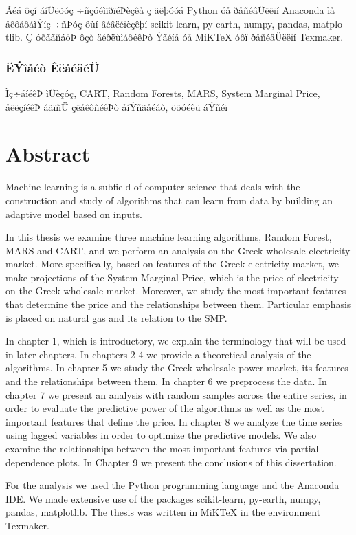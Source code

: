 \documentclass[12pt, twoside, a4paper]{book}
\newcommand{\tl}[1]{\textlatin{#1}}
\newcommand{\en}{\selectlanguage{english}}
\begin{document}
Ãéá ôçí áíÜëõóç ÷ñçóéìïðïéÞèçêå ç ãëþóóá \tl{Python} óå ðåñéâÜëëïí \tl{Anaconda} ìå åêôåôáìÝíç ÷ñÞóç ôùí âéâëéïèçêþí \tl{scikit-learn, py-earth, numpy, pandas, matplotlib}. Ç óõããñáöÞ ôçò äéðëùìáôéêÞò Ýãéíå óå \tl{MiKTeX} óôï ðåñéâÜëëïí \tl{Texmaker}.

\subsection*{ËÝîåéò ÊëåéäéÜ}
Ìç÷áíéêÞ ìÜèçóç, \tl{CART, Random Forests, MARS, System Marginal Price}, åëëçíéêÞ áãïñÜ çëåêôñéêÞò åíÝñãåéáò, öõóéêü áÝñéï

\newpage
\thispagestyle{empty}
\chapter*{\textlatin{Abstract}}
\en
Machine learning is a subfield of computer science that deals with the construction and study of algorithms that can learn from data by building an adaptive model based on inputs.

In this thesis we examine three machine learning algorithms, Random Forest, MARS and CART, and we perform an analysis on the Greek wholesale electricity market. More specifically, based on features of the Greek electricity market, we make projections of the System Marginal Price, which is the price of electricity on the Greek wholesale market. Moreover, we study the most important features that determine the price and the relationships between them. Particular emphasis is placed on natural gas and its relation to the SMP.

In chapter 1, which is introductory, we explain the terminology that will be used in later chapters. In chapters 2-4 we provide a theoretical analysis of the algorithms. In chapter 5 we study the Greek wholesale power market, its features and the relationships between them. In chapter 6 we preprocess the data. In chapter 7 we present an analysis with random samples across the entire series, in order to evaluate the predictive power of the algorithms as well as the most important features that define the price. In chapter 8 we analyze the time series using lagged variables in order to optimize the predictive models. We also examine the relationships between the most important features via partial dependence plots. In Chapter 9 we present the conclusions of this dissertation.

For the analysis we used the Python programming language and the Anaconda IDE. We made extensive use of the packages scikit-learn, py-earth, numpy, pandas, matplotlib. The thesis was written in MiKTeX in the environment Texmaker.
\end{document}
